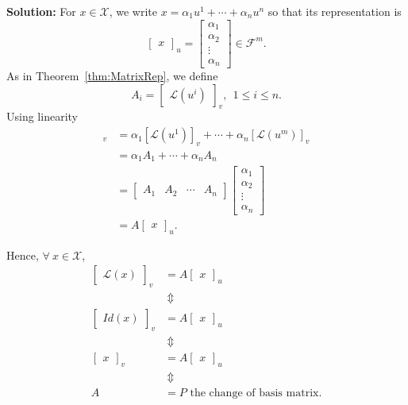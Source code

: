     \textbf{Solution:} For $x \in \mathcal{X}$, we write $x = \alpha_1 u^1 + \cdots + \alpha_n u^n $ so that its representation is
$$\begin{bmatrix}x\end{bmatrix}_u = \begin{bmatrix}\alpha_1 \\ \alpha_2 \\ \vdots \\ \alpha_n \end{bmatrix}\in \mathcal{F}^m.$$
As in Theorem~\ref{thm:MatrixRep}, we define $$A_i = \begin{bmatrix}\mathcal{L}(u^i)\end{bmatrix}_v, ~~1 \le i \le n.$$
Using linearity
    \begin{align*}
        [\mathcal{L}(x)]_v &= \alpha_1[ \mathcal{L}(u^1)]_v + \cdots + \alpha_n [\mathcal{L}(u^m)]_v \\
        &= \alpha_1 A_1 + \cdots + \alpha_n A_n \\
        & = \begin{bmatrix} A_1 & A_2 & \cdots &A_n \end{bmatrix} \begin{bmatrix}\alpha_1 \\ \alpha_2 \\ \vdots \\ \alpha_n \end{bmatrix} \\
        &= A \begin{bmatrix} x \end{bmatrix}_u.
    \end{align*}

Hence, $\forall~ x \in \mathcal{X}$,
    \begin{align*}\begin{bmatrix} \mathcal{L}(x) \end{bmatrix}_v &= A \begin{bmatrix} x \end{bmatrix}_u \\
            &~ \Updownarrow \\
    \begin{bmatrix} Id(x) \end{bmatrix}_v &= A \begin{bmatrix} x \end{bmatrix}_u \\
            & ~\Updownarrow \\
    \begin{bmatrix} x \end{bmatrix}_v &= A \begin{bmatrix} x \end{bmatrix}_u\\
            & ~\Updownarrow \\
            A &= P \text{ the change of basis matrix.}
       \end{align*}
       
